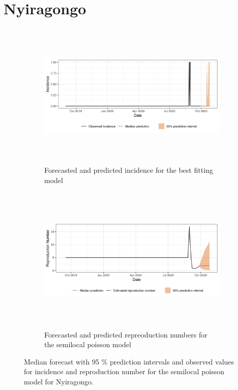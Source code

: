  \section{ Nyiragongo }\begin{figure}[H]\begin{subfigure}{\textwidth}  \centering  \includegraphics[width=0.9\linewidth, height=7cm]{../output/Nyiragongo_predictions.png}  \caption{Forecasted and predicted incidence for the best fitting model}\end{subfigure}

\begin{subfigure}{\textwidth}  \centering  \includegraphics[width=0.9\linewidth, height=7cm]{../output/Nyiragongo_Rs.png}  \caption{Forecasted and predicted repreoduction numbers for the semilocal poisson model}\end{subfigure}  \caption{Median forecast with 95 \% prediction intervals and observed values for incidence and reproduction number for the semilocal poisson model for Nyiragongo.}\end{figure}

